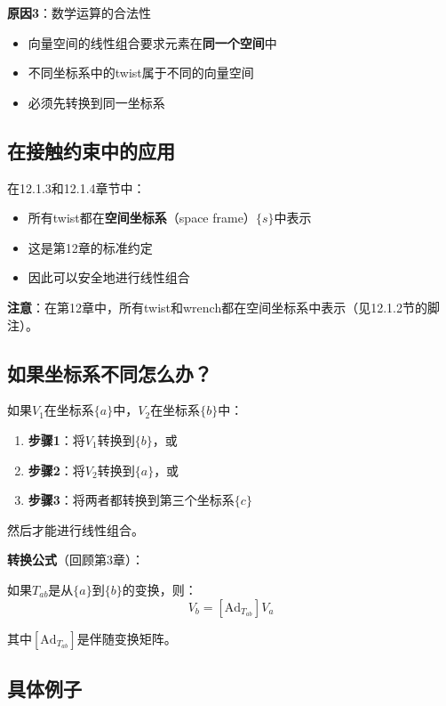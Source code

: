 \documentclass[12pt,a4paper]{article}
\begin{document}
\textbf{原因3}：数学运算的合法性

\begin{itemize}
\item 向量空间的线性组合要求元素在\textbf{同一个空间}中
\item 不同坐标系中的twist属于不同的向量空间
\item 必须先转换到同一坐标系
\end{itemize}

\subsection{在接触约束中的应用}

在12.1.3和12.1.4章节中：

\begin{itemize}
\item 所有twist都在\textbf{空间坐标系}（space frame）$\{s\}$中表示
\item 这是第12章的标准约定
\item 因此可以安全地进行线性组合
\end{itemize}

\textbf{注意}：在第12章中，所有twist和wrench都在空间坐标系中表示（见12.1.2节的脚注）。

\subsection{如果坐标系不同怎么办？}

如果$V_1$在坐标系$\{a\}$中，$V_2$在坐标系$\{b\}$中：

\begin{enumerate}
\item \textbf{步骤1}：将$V_1$转换到$\{b\}$，或
\item \textbf{步骤2}：将$V_2$转换到$\{a\}$，或
\item \textbf{步骤3}：将两者都转换到第三个坐标系$\{c\}$
\end{enumerate}

然后才能进行线性组合。

\textbf{转换公式}（回顾第3章）：

如果$T_{ab}$是从$\{a\}$到$\{b\}$的变换，则：
\begin{equation}
V_b = [\text{Ad}_{T_{ab}}] V_a
\end{equation}

其中$[\text{Ad}_{T_{ab}}]$是伴随变换矩阵。

\subsection{具体例子}
\end{document}
